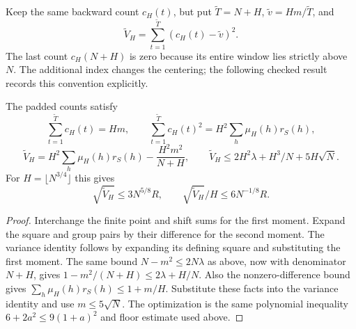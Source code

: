 \begin{definition}
\leanok
\label{core:padded-window-variance-definition}
Keep the same backward count $c_H(t)$, but put $\widetilde T=N+H$,
$\widetilde v=Hm/\widetilde T$, and
\[
 \widetilde V_H=\sum_{t=1}^{\widetilde T}
                   (c_H(t)-\widetilde v)^2.
\]
The last count $c_H(N+H)$ is zero because its entire window lies
strictly above $N$.  The additional index changes the centering;
the following checked result records this convention explicitly.
\end{definition}

\begin{lemma}
\leanok
\label{core:padded-window-variance}
The padded counts satisfy
\[
 \sum_{t=1}^{\widetilde T}c_H(t)=Hm,\qquad
 \sum_{t=1}^{\widetilde T}c_H(t)^2
       =H^2\sum_h\mu_H(h)r_S(h),
\]
\[
 \widetilde V_H=H^2\sum_h\mu_H(h)r_S(h)
                        -\frac{H^2m^2}{N+H},\qquad
 \widetilde V_H\leq2H^2\lambda+H^3/N+5H\sqrt N.
\]
For $H=\lfloor N^{3/4}\rfloor$ this gives
\[
 \sqrt{\widetilde V_H}\leq3N^{5/8}R,\qquad
 \sqrt{\widetilde V_H}/H\leq6N^{-1/8}R.
\]
\end{lemma}
\begin{proof}
Interchange the finite point and shift sums for the first moment.
Expand the square and group pairs by their difference for the second
moment.  The variance identity follows by expanding its defining
square and substituting the first moment.  The same bound
$N-m^2\leq2N\lambda$ as above, now with denominator $N+H$, gives
$1-m^2/(N+H)\leq2\lambda+H/N$.  Also the nonzero-difference bound
gives $\sum_h\mu_H(h)r_S(h)\leq1+m/H$.
Substitute these facts into the variance identity and use
$m\leq5\sqrt N$.  The optimization is the same polynomial
inequality $6+2a^2\leq9(1+a)^2$ and floor estimate used above.
\end{proof}

